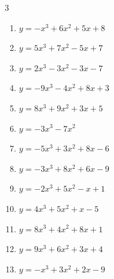 \begin{multicols}{3}
\begin{enumerate}
  \item $y=-x^{3}+6x^{2}+5x+8$


  \item $y=5x^{3}+7x^{2}-5x+7$


  \item $y=2x^{3}-3x^{2}-3x-7$


  \item $y=-9x^{3}-4x^{2}+8x+3$


  \item $y=8x^{3}+9x^{2}+3x+5$


  \item $y=-3x^{3}-7x^{2}$


  \item $y=-5x^{3}+3x^{2}+8x-6$


  \item $y=-3x^{3}+8x^{2}+6x-9$


  \item $y=-2x^{3}+5x^{2}-x+1$


  \item $y=4x^{3}+5x^{2}+x-5$


\columnbreak %

  \item $y=8x^{3}+4x^{2}+8x+1$


  \item $y=9x^{3}+6x^{2}+3x+4$


  \item $y=-x^{3}+3x^{2}+2x-9$


\end{enumerate}
\end{multicols}
